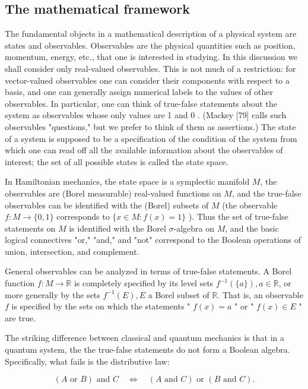 \documentclass[10pt, letterpaper]{article}
\begin{document}
\subsection*{The mathematical framework}
The fundamental objects in a mathematical description of a physical system are states and observables. Observables are the physical quantities such as position, momentum, energy, etc., that one is interested in studying. In this discussion we shall consider only real-valued observables. This is not much of a restriction: for vector-valued observables one can consider their components with respect to a basis, and one can generally assign numerical labels to the values of other observables. In particular, one can think of true-false statements about the system as observables whose only values are 1 and 0 . (Mackey [79] calls such observables "questions," but we prefer to think of them as assertions.) The state of a system is supposed to be a specification of the condition of the system from which one can read off all the available information about the observables of interest; the set of all possible states is called the state space.

In Hamiltonian mechanics, the state space is a symplectic manifold $M$, the observables are (Borel measurable) real-valued functions on $M$, and the true-false observables can be identified with the (Borel) subsets of $M$ (the observable $f: M \rightarrow \{0,1\}$ corresponds to $\{x \in M: f(x)=1\}$ ). Thus the set of true-false statements on $M$ is identified with the Borel $\sigma$-algebra on $M$, and the basic logical connectives "or," "and," and "not" correspond to the Boolean operations of union, intersection, and complement.

General observables can be analyzed in terms of true-false statements. A Borel function $f: M \rightarrow \mathbb{R}$ is completely specified by its level sets $f^{-1}(\{a\}), a \in \mathbb{R}$, or\\
more generally by the sets $f^{-1}(E), E$ a Borel subset of $\mathbb{R}$. That is, an observable $f$ is specified by the sets on which the statements " $f(x)=a$ " or " $f(x) \in E$ " are true.

The striking difference between classical and quantum mechanics is that in a quantum system, the the true-false statements do not form a Boolean algebra. Specifically, what fails is the distributive law:

$$
(A \text { or } B) \text { and } C \quad \Longleftrightarrow \quad(A \text { and } C) \text { or }(B \text { and } C) .
$$
\end{document}
